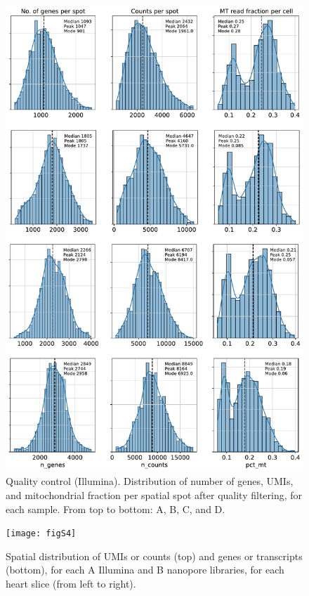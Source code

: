 \documentclass[utf8]{frontiers_suppmat} %
\begin{document}
\begin{figure}[htbp]
\begin{center}
\includegraphics[width=.75\textwidth]{figS3}%
\end{center}
\caption{Quality control (Illumina). Distribution of number of genes, UMIs, and mitochondrial fraction per spatial spot after quality filtering, for each sample. From top to bottom: A, B, C, and D.}\label{fig:S3}
\end{figure}


\begin{figure}[htbp]
\begin{center}
\texttt{[image: figS4]}%
\end{center}
\caption{Spatial distribution of UMIs or counts (top) and genes or transcripts (bottom), for each A Illumina and B nanopore libraries, for each heart slice (from left to right).}\label{fig:S4}
\end{figure}
\end{document}
